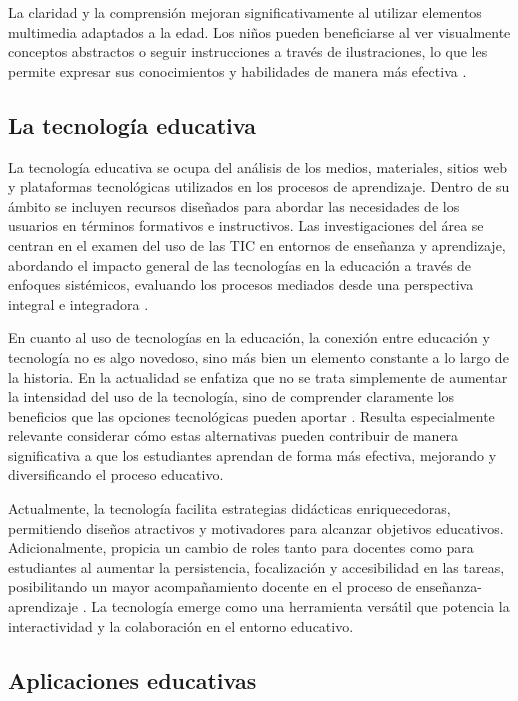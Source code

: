 La claridad y la comprensión mejoran significativamente al utilizar elementos multimedia adaptados a la edad. Los niños pueden beneficiarse al ver visualmente conceptos abstractos o seguir instrucciones a través de ilustraciones, lo que les permite expresar sus conocimientos y habilidades de manera más efectiva \cite{ref43_paivio}.

\subsection{La tecnología educativa}

La tecnología educativa se ocupa del análisis de los medios, materiales, sitios web y plataformas tecnológicas utilizados en los procesos de aprendizaje. Dentro de su ámbito se incluyen recursos diseñados para abordar las necesidades de los usuarios en términos formativos e instructivos. Las investigaciones del área se centran en el examen del uso de las TIC en entornos de enseñanza y aprendizaje, abordando el impacto general de las tecnologías en la educación a través de enfoques sistémicos, evaluando los procesos mediados desde una perspectiva integral e integradora \cite{ref42_cabero}.

En cuanto al uso de tecnologías en la educación, la conexión entre educación y tecnología no es algo novedoso, sino más bien un elemento constante a lo largo de la historia. En la actualidad se enfatiza que no se trata simplemente de aumentar la intensidad del uso de la tecnología, sino de comprender claramente los beneficios que las opciones tecnológicas pueden aportar \cite{ref44_selwyn}. Resulta especialmente relevante considerar cómo estas alternativas pueden contribuir de manera significativa a que los estudiantes aprendan de forma más efectiva, mejorando y diversificando el proceso educativo.

Actualmente, la tecnología facilita estrategias didácticas enriquecedoras, permitiendo diseños atractivos y motivadores para alcanzar objetivos educativos. Adicionalmente, propicia un cambio de roles tanto para docentes como para estudiantes al aumentar la persistencia, focalización y accesibilidad en las tareas, posibilitando un mayor acompañamiento docente en el proceso de enseñanza-aprendizaje \cite{ref45_unesco_tic}. La tecnología emerge como una herramienta versátil que potencia la interactividad y la colaboración en el entorno educativo.

\subsection{Aplicaciones educativas}

